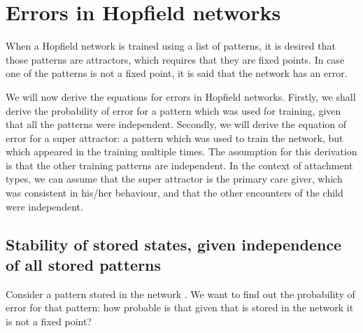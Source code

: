 
\newcommand{\mathpi}{\pi}
\newcommand{\nin}{\not\in}
\newcommand{\nosymbol}{}
\newcommand{\tmem}[1]{{\em #1\/}}
\newcommand{\tmkbd}[1]{\texttt{#1}}
\newcommand{\tmfloatcontents}{}
\newlength{\tmfloatwidth}
\newcommand{\tmfloat}[5]{
  \renewcommand{\tmfloatcontents}{#4}
  \setlength{\tmfloatwidth}{\widthof{\tmfloatcontents}+1in}
  \ifthenelse{\equal{#2}{small}}
    {\ifthenelse{\lengthtest{\tmfloatwidth > \linewidth}}
      {\setlength{\tmfloatwidth}{\linewidth}}{}}
    {\setlength{\tmfloatwidth}{\linewidth}}
  \begin{minipage}[#1]{\tmfloatwidth}
    \begin{center}
      \tmfloatcontents
      \captionof{#3}{#5}
    \end{center}
  \end{minipage}}


\chapter{Errors in Hopfield networks}

When a Hopfield network is trained using a list of patterns, it is desired
that those patterns are attractors, which requires that they are fixed points.
In case one of the patterns is not a fixed point, it is said that the network
has an error.

We will now derive the equations for errors in Hopfield networks.
Firstly, we shall derive the probability of error for a pattern which was used
for training, given that all the patterns were independent. Secondly, we will
derive the equation of error for a super attractor: a pattern which was used
to train the network, but which appeared in the training multiple times. The
assumption for this derivation is that the other training patterns are
independent. In the context of attachment types, we can assume that the super
attractor is the primary care giver, which was consistent in his/her
behaviour, and that the other encounters of the child were independent.

\section{Stability of stored states, given independence of all stored
patterns}

Consider a pattern stored in the network . We want to find out
the probability of error for that pattern: how probable is that given that
 is stored in the network it is not a fixed point?

